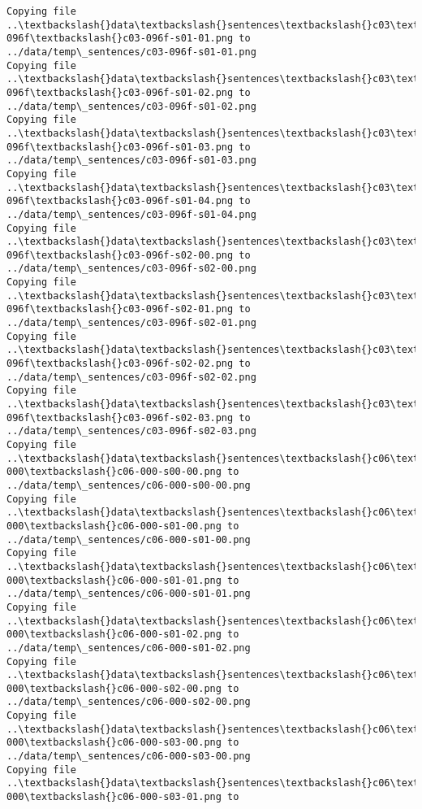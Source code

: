 \documentclass[11pt]{article}
\begin{document}
\begin{Verbatim}[commandchars=\\\{\}]
Copying file ..\textbackslash{}data\textbackslash{}sentences\textbackslash{}c03\textbackslash{}c03-096f\textbackslash{}c03-096f-s01-01.png to
../data/temp\_sentences/c03-096f-s01-01.png
Copying file ..\textbackslash{}data\textbackslash{}sentences\textbackslash{}c03\textbackslash{}c03-096f\textbackslash{}c03-096f-s01-02.png to
../data/temp\_sentences/c03-096f-s01-02.png
Copying file ..\textbackslash{}data\textbackslash{}sentences\textbackslash{}c03\textbackslash{}c03-096f\textbackslash{}c03-096f-s01-03.png to
../data/temp\_sentences/c03-096f-s01-03.png
Copying file ..\textbackslash{}data\textbackslash{}sentences\textbackslash{}c03\textbackslash{}c03-096f\textbackslash{}c03-096f-s01-04.png to
../data/temp\_sentences/c03-096f-s01-04.png
Copying file ..\textbackslash{}data\textbackslash{}sentences\textbackslash{}c03\textbackslash{}c03-096f\textbackslash{}c03-096f-s02-00.png to
../data/temp\_sentences/c03-096f-s02-00.png
Copying file ..\textbackslash{}data\textbackslash{}sentences\textbackslash{}c03\textbackslash{}c03-096f\textbackslash{}c03-096f-s02-01.png to
../data/temp\_sentences/c03-096f-s02-01.png
Copying file ..\textbackslash{}data\textbackslash{}sentences\textbackslash{}c03\textbackslash{}c03-096f\textbackslash{}c03-096f-s02-02.png to
../data/temp\_sentences/c03-096f-s02-02.png
Copying file ..\textbackslash{}data\textbackslash{}sentences\textbackslash{}c03\textbackslash{}c03-096f\textbackslash{}c03-096f-s02-03.png to
../data/temp\_sentences/c03-096f-s02-03.png
Copying file ..\textbackslash{}data\textbackslash{}sentences\textbackslash{}c06\textbackslash{}c06-000\textbackslash{}c06-000-s00-00.png to
../data/temp\_sentences/c06-000-s00-00.png
Copying file ..\textbackslash{}data\textbackslash{}sentences\textbackslash{}c06\textbackslash{}c06-000\textbackslash{}c06-000-s01-00.png to
../data/temp\_sentences/c06-000-s01-00.png
Copying file ..\textbackslash{}data\textbackslash{}sentences\textbackslash{}c06\textbackslash{}c06-000\textbackslash{}c06-000-s01-01.png to
../data/temp\_sentences/c06-000-s01-01.png
Copying file ..\textbackslash{}data\textbackslash{}sentences\textbackslash{}c06\textbackslash{}c06-000\textbackslash{}c06-000-s01-02.png to
../data/temp\_sentences/c06-000-s01-02.png
Copying file ..\textbackslash{}data\textbackslash{}sentences\textbackslash{}c06\textbackslash{}c06-000\textbackslash{}c06-000-s02-00.png to
../data/temp\_sentences/c06-000-s02-00.png
Copying file ..\textbackslash{}data\textbackslash{}sentences\textbackslash{}c06\textbackslash{}c06-000\textbackslash{}c06-000-s03-00.png to
../data/temp\_sentences/c06-000-s03-00.png
Copying file ..\textbackslash{}data\textbackslash{}sentences\textbackslash{}c06\textbackslash{}c06-000\textbackslash{}c06-000-s03-01.png to

\end{Verbatim}
\end{document}
